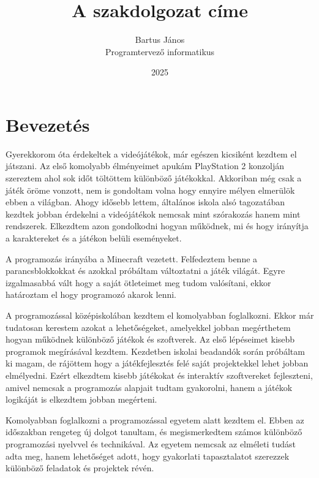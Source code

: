 \documentclass[
]{thesis-ekf}
\theoremstyle{definition}
\theoremstyle{remark}
\begin{document}
\title{A szakdolgozat címe}
\author{Bartus János\\Programtervező informatikus}
\date{2025}
\maketitle

\tableofcontents

\chapter*{Bevezetés}
Gyerekkorom óta érdekeltek a videójátékok, már egészen kicsiként kezdtem el játszani. Az első komolyabb élményeimet apukám PlayStation 2 konzolján szereztem ahol sok időt töltöttem különböző játékokkal. Akkoriban még csak a játék öröme vonzott, nem is gondoltam volna hogy ennyire mélyen elmerülök ebben a világban.
Ahogy idősebb lettem, általános iskola alsó tagozatában kezdtek jobban érdekelni a videójátékok nemcsak mint szórakozás hanem mint rendszerek. Elkezdtem azon gondolkodni hogyan működnek, mi és hogy irányítja a karaktereket és a játékon belüli eseményeket.
 
A programozás irányába a Minecraft vezetett. Felfedeztem benne a parancsblokkokkat és azokkal próbáltam változtatni a játék világát. Egyre izgalmasabbá vált hogy a saját ötleteimet meg tudom valósítani, ekkor határoztam el hogy programozó akarok lenni.

A programozással középiskolában kezdtem el komolyabban foglalkozni. Ekkor már tudatosan kerestem azokat a lehetőségeket, amelyekkel jobban megérthetem hogyan működnek különböző játékok és szoftverek. Az első lépéseimet kisebb programok megírásával kezdtem. Kezdetben iskolai beadandók során próbáltam ki magam, de rájöttem hogy a játékfejlesztés felé saját projektekkel lehet jobban elmélyedni. Ezért elkezdtem kisebb játékokat és interaktív szoftvereket fejleszteni, amivel nemcsak a programozás alapjait tudtam gyakorolni, hanem a játékok logikáját is elkezdtem jobban megérteni.

Komolyabban foglalkozni a programozással egyetem alatt kezdtem el. Ebben az időszakban rengeteg új dolgot tanultam, és megismerkedtem számos különböző programozási nyelvvel és technikával. Az egyetem nemcsak az elméleti tudást adta meg, hanem lehetőséget adott, hogy gyakorlati tapasztalatot szerezzek különböző feladatok és projektek révén.
\end{document}
